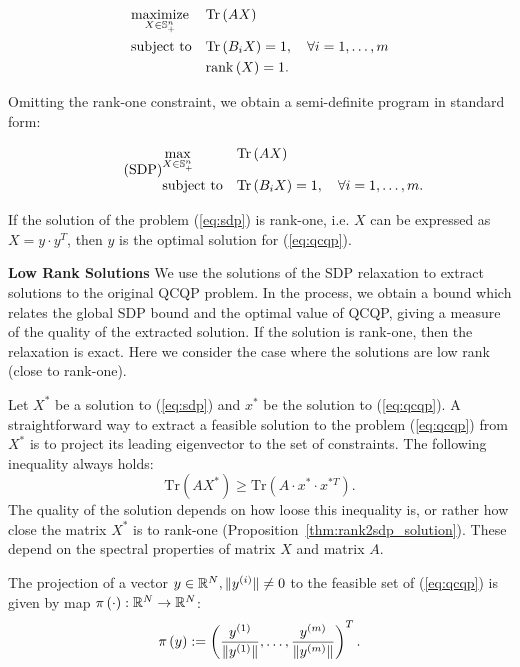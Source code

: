 \begin{equation*}
\begin{aligned}
& \underset{X \in \mathbb{S}_{+}^n}{\text{maximize}}
& &\mathrm{Tr}\left(A X\right) \\
& \text{subject to}
& &\mathrm{Tr}\left(B_i X\right) = 1,  \quad\forall i =1,\ldots,m\\
& & &\mathrm{rank}\left(X\right) = 1.
\end{aligned}
\end{equation*}

Omitting the rank-one constraint, we obtain a semi-definite program in standard form:

\begin{equation}\label{eq:sdp}
\tag{SDP}
\begin{aligned}
& \underset{X \in \mathbb{S}_{+}^n}{\text{max}}
& &\mathrm{Tr}\left(A X\right) \\
& \text{subject to}
& &\mathrm{Tr}\left(B_i X\right) = 1,  \quad\forall i =1,\ldots,m.\\
\end{aligned}
\end{equation}

If the solution of the problem (\ref{eq:sdp}) is rank-one, i.e. $X$ can be expressed as $X = y \cdot y^T$,
then $y$ is the optimal solution for (\ref{eq:qcqp}).

\noindent\textbf{Low Rank Solutions}
We use the solutions of the SDP relaxation to extract solutions to
the original QCQP problem. In the process, we obtain a bound which relates
the global SDP bound and the optimal value of QCQP, giving a measure of
the quality of the extracted solution. If the solution is
rank-one, then the relaxation is exact. Here we consider the case where the solutions are
 low rank (close to rank-one).

Let $X^*$ be a solution to (\ref{eq:sdp}) and $x^{*}$ be the solution
to (\ref{eq:qcqp}).
A straightforward way to extract a feasible solution to the problem
(\ref{eq:qcqp}) from $X^*$ is to project its leading eigenvector to
the set of constraints.  The following inequality always holds:
 $$\mathrm{Tr}\left(A X^{*}\right) \geq \mathrm{Tr}\left(A \cdot x^{*} \cdot x^{*T}\right).$$
The quality of the solution depends on how loose this inequality is,
or rather how close the matrix $X^*$ is to rank-one (Proposition~\ref{thm:rank2sdp_solution}).
These depend on the spectral properties of matrix
$X$ and matrix $A$.

The projection of a vector $y \in \mathbb{R}^N, \lVert y^{(i)}\rVert \neq 0$ to the
feasible set of (\ref{eq:qcqp}) is given by map $\pi\left(\cdot\right) : \mathbb{R}^N \rightarrow \mathbb{R}^N$:
$$\pi\left(y\right) := \left(\frac{y^{(1)}}{\lVert y^{(1)}\rVert}, \ldots, \frac{y^{(m)}}{\lVert y^{(m)}\rVert}\right)^T.$$

